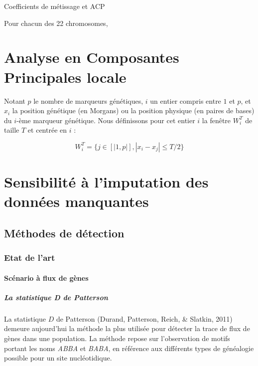 \documentclass[12pt,twoside]{reedthesis}
\begin{document}
  Coefficients de métissage et ACP
  
  Pour chacun des 22 chromosomes,
  
  \section{Analyse en Composantes Principales
  locale}\label{analyse-en-composantes-principales-locale}
  
  Notant \(p\) le nombre de marqueurs génétiques, \(i\) un entier compris
  entre \(1\) et \(p\), et \(x_i\) la position génétique (en Morgans) ou
  la position physique (en paires de bases) du \(i\)-ème marqueur
  génétique. Nous définissons pour cet entier \(i\) la fenêtre \(W_i^T\)
  de taille \(T\) et centrée en \(i\) :
  
  \[W_i^T = \{ j \in [|1, p|], |x_i - x_j| \leq T/2 \}\]
  
  \section{Sensibilité à l'imputation des données
  manquantes}\label{sensibilite-a-limputation-des-donnees-manquantes}
  
  \newpage
  
  \subsection{Méthodes de détection}\label{methodes-de-detection}
  
  \subsubsection{Etat de l'art}\label{etat-de-lart-1}
  
  \paragraph{Scénario à flux de gènes}\label{scenario-a-flux-de-genes}
  
  \subparagraph{La statistique D de
  Patterson}\label{la-statistique-d-de-patterson}
  
  La statistique \(D\) de Patterson (Durand, Patterson, Reich, \& Slatkin,
  2011) demeure aujourd'hui la méthode la plus utilisée pour détecter la
  trace de flux de gènes dans une population. La méthode repose sur
  l'observation de motifs portant les noms \emph{ABBA} et \emph{BABA}, en
  référence aux différents types de généalogie possible pour un site
  nucléotidique.
  
\end{document}
